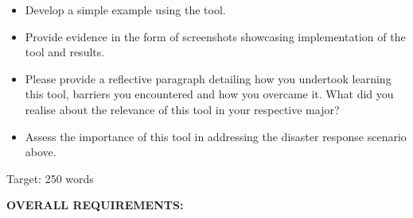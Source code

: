\documentclass[a4paper, 11pt]{report}
\begin{document}
\begin{itemize}
    \item Develop a simple example using the tool.
    \item Provide evidence in the form of screenshots showcasing implementation of the tool and results.
    \item Please provide a reflective paragraph detailing how you undertook learning this tool, barriers you encountered and how you overcame it. What did you realise about the relevance of this tool in your respective major?
    \item Assess the importance of this tool in addressing the disaster response scenario above.
\end{itemize}

Target: 250 words

\vspace{6ex}

\textbf{OVERALL REQUIREMENTS:}
\end{document}
